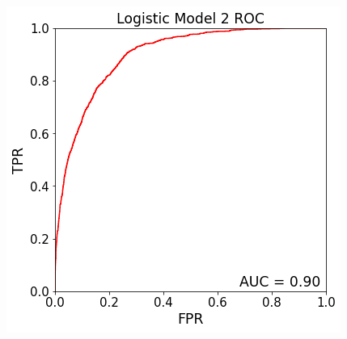 \documentclass{article}
\begin{document}
	\begin{multicols}{2}
	\begin{center}
	
	\includegraphics[scale = .4]{Logistic Model 2_ROC}
	
	\columnbreak
	
	
	
	\vspace{0.2 in}
	
	
	
	
	\end{center}
	\end{multicols}
\end{document}
